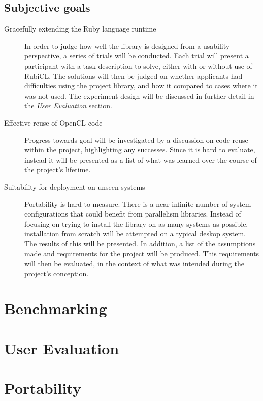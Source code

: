 \subsection{Subjective goals}
\begin{description}
\item[Gracefully extending the Ruby language runtime]
In order to judge how well the library is designed from a usability perspective, a series of trials will be conducted.
Each trial will present a participant with a task description to solve, either with or without use of RubiCL.
The solutions will then be judged on whether applicants had difficulties using the project library, and how it compared to cases where it was not used.
The experiment design will be discussed in further detail in the \emph{User Evaluation} section.
\item[Effective reuse of \ac{OpenCL} code]
Progress towards goal will be investigated by a discussion on code reuse within the project, highlighting any successes. Since it is hard to evaluate, instead it will be presented as a list of what was learned over the course of the project's lifetime.
\item[Suitability for deployment on unseen systems]
Portability is hard to measure. There is a near-infinite number of system configurations that could benefit from parallelism libraries. Instead of focusing on trying to install the library on as many systems as possible, installation from scratch will be attempted on a typical deskop system.  The results of this will be presented. In addition, a list of the assumptions made and requirements for the project will be produced. This requirements will then be evaluated, in the context of what was intended during the project's conception.
\end{description}

\section{Benchmarking}

\section{User Evaluation}

\section{Portability}
